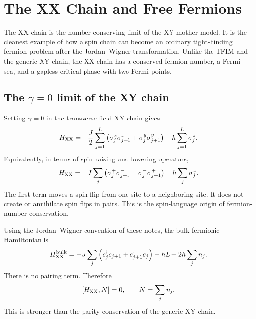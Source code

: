 \chapter{The XX Chain and Free Fermions}
\label{chap:xx-chain-free-fermions}

The XX chain is the number-conserving limit of the XY mother model.  It is the
cleanest example of how a spin chain can become an ordinary tight-binding
fermion problem after the Jordan--Wigner transformation.  Unlike the TFIM and
the generic XY chain, the XX chain has a conserved fermion number, a Fermi sea,
and a gapless critical phase with two Fermi points.

\section{The \texorpdfstring{$\gamma=0$}{gamma=0} limit of the XY chain}
\label{sec:xx-gamma-zero-limit}

Setting $\gamma=0$ in the transverse-field XY chain gives
\begin{equation}
\label{eq:xx-spin-hamiltonian}
    H_{\rm XX}
    =
    -\frac{J}{2}\sum_{j=1}^{L}
    \left(
        \sigma_j^x\sigma_{j+1}^x
        +
        \sigma_j^y\sigma_{j+1}^y
    \right)
    -h\sum_{j=1}^{L}\sigma_j^z.
\end{equation}
Equivalently, in terms of spin raising and lowering operators,
\begin{equation}
\label{eq:xx-spin-flip-form}
    H_{\rm XX}
    =
    -J\sum_j
    \left(
        \sigma_j^+\sigma_{j+1}^-
        +
        \sigma_j^-\sigma_{j+1}^+
    \right)
    -h\sum_j\sigma_j^z.
\end{equation}
The first term moves a spin flip from one site to a neighboring site.  It does
not create or annihilate spin flips in pairs.  This is the spin-language origin
of fermion-number conservation.

Using the Jordan--Wigner convention of these notes, the bulk fermionic
Hamiltonian is
\begin{equation}
\label{eq:xx-fermion-hamiltonian-real-space}
    H_{\rm XX}^{\rm bulk}
    =
    -J\sum_j
    \left(
        c_j^\dagger c_{j+1}+c_{j+1}^\dagger c_j
    \right)
    -hL+2h\sum_j n_j .
\end{equation}
There is no pairing term.  Therefore
\begin{equation}
\label{eq:xx-number-conservation}
    [H_{\rm XX},N]=0,
    \qquad
    N=\sum_j n_j.
\end{equation}
This is stronger than the parity conservation of the generic XY chain.

